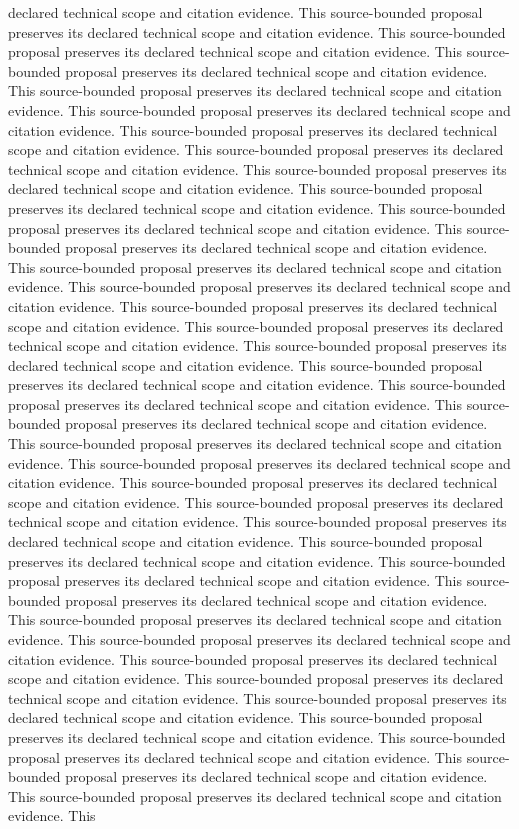 \documentclass{article}
\begin{document}
declared technical scope and citation evidence. This source-bounded proposal preserves its declared technical scope and citation evidence. This source-bounded proposal preserves its declared technical scope and citation evidence. This source-bounded proposal preserves its declared technical scope and citation evidence. This source-bounded proposal preserves its declared technical scope and citation evidence. This source-bounded proposal preserves its declared technical scope and citation evidence. This source-bounded proposal preserves its declared technical scope and citation evidence. This source-bounded proposal preserves its declared technical scope and citation evidence. This source-bounded proposal preserves its declared technical scope and citation evidence. This source-bounded proposal preserves its declared technical scope and citation evidence. This source-bounded proposal preserves its declared technical scope and citation evidence. This source-bounded proposal preserves its declared technical scope and citation evidence. This source-bounded proposal preserves its declared technical scope and citation evidence. This source-bounded proposal preserves its declared technical scope and citation evidence. This source-bounded proposal preserves its declared technical scope and citation evidence. This source-bounded proposal preserves its declared technical scope and citation evidence. This source-bounded proposal preserves its declared technical scope and citation evidence. This source-bounded proposal preserves its declared technical scope and citation evidence. This source-bounded proposal preserves its declared technical scope and citation evidence. This source-bounded proposal preserves its declared technical scope and citation evidence. This source-bounded proposal preserves its declared technical scope and citation evidence. This source-bounded proposal preserves its declared technical scope and citation evidence. This source-bounded proposal preserves its declared technical scope and citation evidence. This source-bounded proposal preserves its declared technical scope and citation evidence. This source-bounded proposal preserves its declared technical scope and citation evidence. This source-bounded proposal preserves its declared technical scope and citation evidence. This source-bounded proposal preserves its declared technical scope and citation evidence. This source-bounded proposal preserves its declared technical scope and citation evidence. This source-bounded proposal preserves its declared technical scope and citation evidence. This source-bounded proposal preserves its declared technical scope and citation evidence. This source-bounded proposal preserves its declared technical scope and citation evidence. This source-bounded proposal preserves its declared technical scope and citation evidence. This source-bounded proposal preserves its declared technical scope and citation evidence. This source-bounded proposal preserves its declared technical scope and citation evidence. This source-bounded proposal preserves its declared technical scope and citation evidence. This source-bounded proposal preserves its declared technical scope and citation evidence. This source-bounded proposal preserves its declared technical scope and citation evidence. This 
\end{document}
